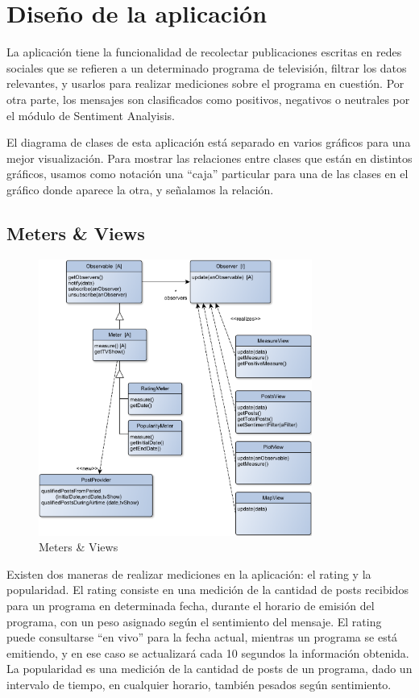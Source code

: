 
\section{Diseño de la aplicación}


La aplicación tiene la funcionalidad de recolectar publicaciones escritas en redes sociales que se refieren a un determinado programa de televisión, filtrar los datos relevantes, y usarlos para realizar mediciones sobre el programa en cuestión. 
Por otra parte, los mensajes son clasificados como positivos, negativos o neutrales por el módulo de Sentiment Analyisis.
\medskip

El diagrama de clases de esta aplicación está separado en varios gráficos para una mejor visualización. Para mostrar las relaciones entre clases que están en distintos gráficos, usamos como notación una ``caja'' particular para una de las clases en el gráfico donde aparece la otra, y señalamos la relación.

\subsection{Meters \& Views}

\begin{figure}[H]
\centering
\includegraphics[width=0.8\textwidth]{graph/clase/meters.pdf}
\caption{Meters \& Views}
\end{figure}

Existen dos maneras de realizar mediciones en la aplicación: el rating y la popularidad. El rating consiste en una medición de la cantidad de posts recibidos para un programa en determinada fecha, durante el horario de emisión del programa, con un peso asignado según el sentimiento del mensaje. El rating puede consultarse ``en vivo'' para la fecha actual, mientras un programa se está emitiendo, y en ese caso se actualizará cada 10 segundos la información obtenida. La popularidad es una medición de la cantidad de posts de un programa, dado un intervalo de tiempo, en cualquier horario, también pesados según sentimiento.
\medskip

